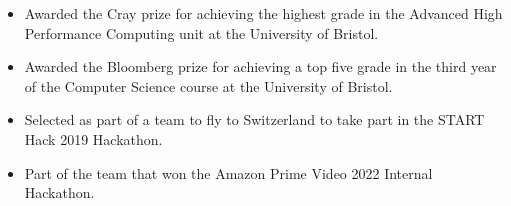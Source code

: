 \vspace{-1.1em}


\begin{cvparagraph}

\begin{itemize}[leftmargin=*]
    \itemsep-0.6em
    \item {Awarded the Cray prize for achieving the highest grade in the Advanced High Performance Computing unit at the University of Bristol.}
    \item {Awarded the Bloomberg prize for achieving a top five grade in the third year of the Computer Science course at the University of Bristol.}
    \item {Selected as part of a team to fly to Switzerland to take part in the START Hack 2019 Hackathon.}
    \item {Part of the team that won the Amazon Prime Video 2022 Internal Hackathon.}
\end{itemize}

\end{cvparagraph}